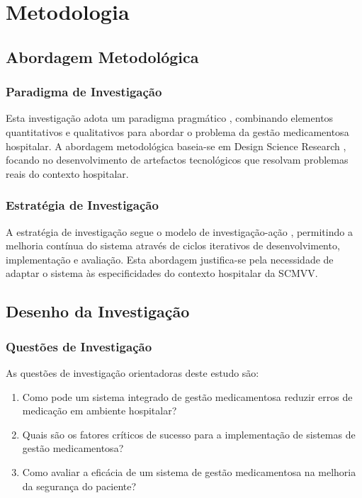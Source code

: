 \chapter{Metodologia}

\section{Abordagem Metodológica}

\subsection{Paradigma de Investigação}

Esta investigação adota um paradigma pragmático \cite{venkatesh2003}, combinando elementos quantitativos e qualitativos para abordar o problema da gestão medicamentosa hospitalar. A abordagem metodológica baseia-se em Design Science Research \cite{martin2017}, focando no desenvolvimento de artefactos tecnológicos que resolvam problemas reais do contexto hospitalar.

\subsection{Estratégia de Investigação}

A estratégia de investigação segue o modelo de investigação-ação \cite{greenhalgh2017}, permitindo a melhoria contínua do sistema através de ciclos iterativos de desenvolvimento, implementação e avaliação. Esta abordagem justifica-se pela necessidade de adaptar o sistema às especificidades do contexto hospitalar da SCMVV.

\section{Desenho da Investigação}

\subsection{Questões de Investigação}

As questões de investigação orientadoras deste estudo são:

\begin{enumerate}
    \item Como pode um sistema integrado de gestão medicamentosa reduzir erros de medicação em ambiente hospitalar?
    \item Quais são os fatores críticos de sucesso para a implementação de sistemas de gestão medicamentosa?
    \item Como avaliar a eficácia de um sistema de gestão medicamentosa na melhoria da segurança do paciente?
\end{enumerate}

